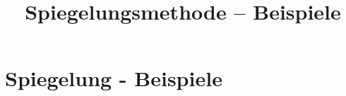 
\usepackage{tikz-3dplot}
\title[TET Vertiefung: Spiegelungsmethode -- Beispiele]{Spiegelungsmethode -- Beispiele}


% 
% 

\maketitle

% 
% 
\section{Spiegelung - Beispiele}


